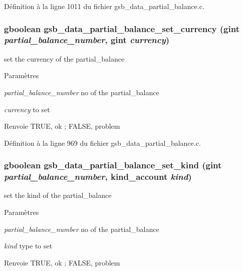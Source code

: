 Définition à la ligne 1011 du fichier gsb\_\-data\_\-partial\_\-balance.c.

\subsubsection[{gsb\_\-data\_\-partial\_\-balance\_\-set\_\-currency}]{\setlength{\rightskip}{0pt plus 5cm}gboolean gsb\_\-data\_\-partial\_\-balance\_\-set\_\-currency (gint {\em partial\_\-balance\_\-number}, \/  gint {\em currency})}\label{gsb__data__partial__balance_8h_af4cb703ca2fc2dd7795ac931ce6c0cc7}
set the currency of the partial\_\-balance


\begin{DoxyParams}{Paramètres}
\item[{\em partial\_\-balance\_\-number}]no of the partial\_\-balance \item[{\em currency}]to set\end{DoxyParams}
\begin{DoxyReturn}{Renvoie}
TRUE, ok ; FALSE, problem 
\end{DoxyReturn}


Définition à la ligne 969 du fichier gsb\_\-data\_\-partial\_\-balance.c.

\subsubsection[{gsb\_\-data\_\-partial\_\-balance\_\-set\_\-kind}]{\setlength{\rightskip}{0pt plus 5cm}gboolean gsb\_\-data\_\-partial\_\-balance\_\-set\_\-kind (gint {\em partial\_\-balance\_\-number}, \/  {\bf kind\_\-account} {\em kind})}\label{gsb__data__partial__balance_8h_ac2900a59a974385c4946ecddb1618f83}
set the kind of the partial\_\-balance 
\begin{DoxyParams}{Paramètres}
\item[{\em partial\_\-balance\_\-number}]no of the partial\_\-balance \item[{\em kind}]type to set\end{DoxyParams}
\begin{DoxyReturn}{Renvoie}
TRUE, ok ; FALSE, problem 
\end{DoxyReturn}


